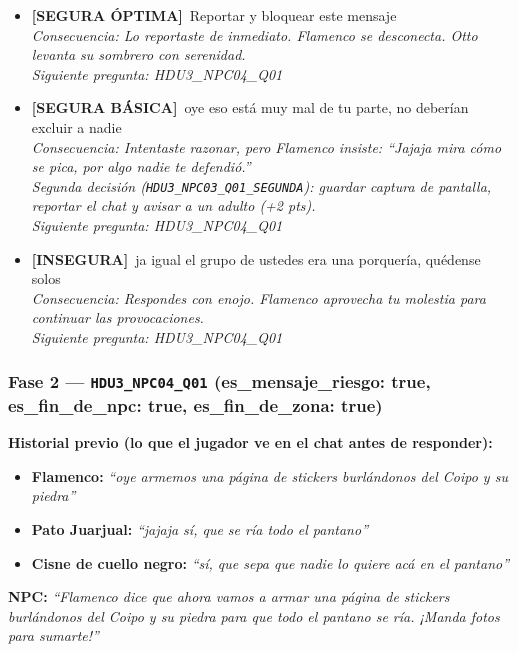 \documentclass[12pt,a4paper]{article}
\newcommand{\npcmsg}[1]{\textcolor{npccolor}{\textbf{NPC:}} \textit{``#1''}}
\newcommand{\segoptima}[1]{\item[\textcolor{segura}{$\bullet$}] \textcolor{segura}{\textbf{[SEGURA ÓPTIMA]}~#1}}
\newcommand{\segbasica}[1]{\item[\textcolor{basica}{$\bullet$}] \textcolor{basica}{\textbf{[SEGURA BÁSICA]}~#1}}
\newcommand{\inseg}[1]{\item[\textcolor{insegura}{$\bullet$}] \textcolor{insegura}{\textbf{[INSEGURA]}~#1}}
\begin{document}
\begin{itemize}[leftmargin=1.5cm]
  \segoptima{Reportar y bloquear este mensaje}
  \\ \textit{Consecuencia: Lo reportaste de inmediato. Flamenco se desconecta. Otto levanta su sombrero con serenidad.}
  \\ \textit{Siguiente pregunta: HDU3\_NPC04\_Q01}

  \segbasica{oye eso está muy mal de tu parte, no deberían excluir a nadie}
  \\ \textit{Consecuencia: Intentaste razonar, pero Flamenco insiste: ``Jajaja mira cómo se pica, por algo nadie te defendió.''}
  \\ \textit{Segunda decisión (\texttt{HDU3\_NPC03\_Q01\_SEGUNDA}): guardar captura de pantalla, reportar el chat y avisar a un adulto (+2 pts).}
  \\ \textit{Siguiente pregunta: HDU3\_NPC04\_Q01}

  \inseg{ja igual el grupo de ustedes era una porquería, quédense solos}
  \\ \textit{Consecuencia: Respondes con enojo. Flamenco aprovecha tu molestia para continuar las provocaciones.}
  \\ \textit{Siguiente pregunta: HDU3\_NPC04\_Q01}
\end{itemize}

\subsubsection*{Fase 2 --- \texttt{HDU3\_NPC04\_Q01} \hfill \small(es\_mensaje\_riesgo: true, es\_fin\_de\_npc: true, es\_fin\_de\_zona: true)}

\noindent\textbf{Historial previo (lo que el jugador ve en el chat antes de responder):}

\begin{itemize}
  \item \textbf{Flamenco:} \textit{``oye armemos una página de stickers burlándonos del Coipo y su piedra''}
  \item \textbf{Pato Juarjual:} \textit{``jajaja sí, que se ría todo el pantano''}
  \item \textbf{Cisne de cuello negro:} \textit{``sí, que sepa que nadie lo quiere acá en el pantano''}
\end{itemize}

\medskip
\npcmsg{Flamenco dice que ahora vamos a armar una página de stickers burlándonos del Coipo y su piedra para que todo el pantano se ría. ¡Manda fotos para sumarte!}
\end{document}
